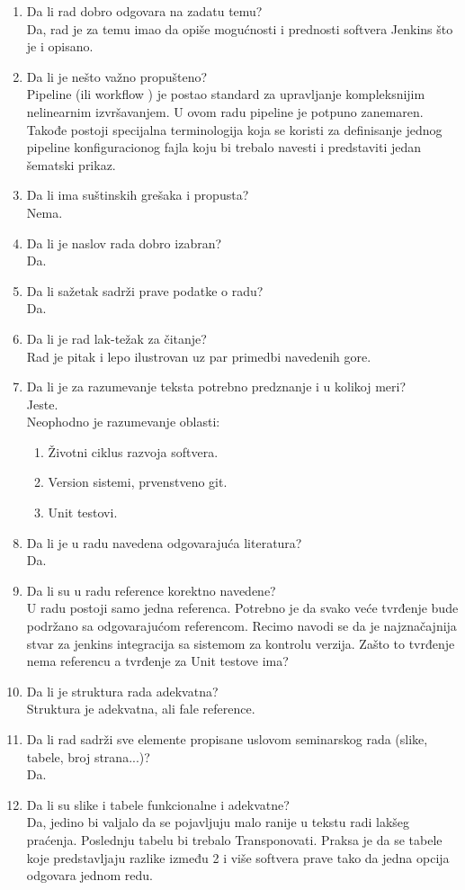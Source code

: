 \documentclass[a4paper]{report}
\begin{document}
\begin{enumerate}
\item Da li rad dobro odgovara na zadatu temu?\\
  Da, rad je za temu imao da opiše mogućnosti i prednosti softvera Jenkins što je i opisano.
\item Da li je nešto važno propušteno?\\
  Pipeline (ili workflow ) je postao standard za upravljanje kompleksnijim nelinearnim
  izvršavanjem. U ovom radu pipeline je potpuno zanemaren. Takođe postoji specijalna
  terminologija koja se koristi za definisanje jednog pipeline konfiguracionog fajla koju bi trebalo
  navesti i predstaviti jedan šematski prikaz.
\item Da li ima suštinskih grešaka i propusta?\\
  Nema.
\item Da li je naslov rada dobro izabran?\\
  Da.
\item Da li sažetak sadrži prave podatke o radu?\\
  Da.
\item Da li je rad lak-težak za čitanje?\\
  Rad je pitak i lepo ilustrovan uz par primedbi navedenih gore.
\item Da li je za razumevanje teksta potrebno predznanje i u kolikoj meri?\\
  Jeste. \\
  Neophodno je razumevanje oblasti:
  \begin{enumerate}
      \item Životni ciklus razvoja softvera.
      \item Version sistemi, prvenstveno git.
      \item Unit testovi.
  \end{enumerate}
\item Da li je u radu navedena odgovarajuća literatura?\\
  Da.
\item Da li su u radu reference korektno navedene?\\
  U radu postoji samo jedna referenca. Potrebno je da svako veće tvrđenje bude podržano
  sa odgovarajućom referencom. Recimo navodi se da je najznačajnija stvar za jenkins integracija
  sa sistemom za kontrolu verzija. Zašto to tvrđenje nema referencu a tvrđenje za Unit testove ima?
\item Da li je struktura rada adekvatna?\\
  Struktura je adekvatna, ali fale reference.
\item Da li rad sadrži sve elemente propisane uslovom seminarskog rada (slike, tabele, broj strana...)?\\
  Da.
\item Da li su slike i tabele funkcionalne i adekvatne?\\
  Da, jedino bi valjalo da se pojavljuju malo ranije u tekstu radi lakšeg praćenja.
  Poslednju tabelu bi trebalo Transponovati. Praksa je da se tabele koje predstavljaju
  razlike između 2 i više softvera prave tako da jedna opcija odgovara jednom redu.
\end{enumerate}
\end{document}
